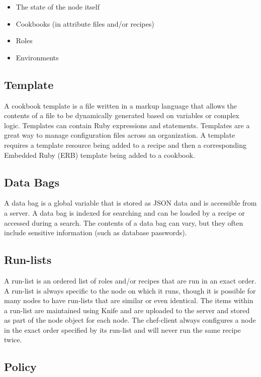 \begin{itemize}
  \item The state of the node itself
  \item Cookbooks (in attribute files and/or recipes)
  \item Roles
  \item Environments
\end{itemize}

\subsection{Template}

A cookbook template is a file written in a markup language that allows the contents of a file to be dynamically generated based on variables or complex logic. Templates can contain Ruby expressions and statements. Templates are a great way to manage configuration files across an organization. A template requires a template resource being added to a recipe and then a corresponding Embedded Ruby (ERB) template being added to a cookbook.

\subsection{Data Bags}

A data bag is a global variable that is stored as JSON data and is accessible from a server. A data bag is indexed for searching and can be loaded by a recipe or accessed during a search. The contents of a data bag can vary, but they often include sensitive information (such as database passwords).

\subsection{Run-lists}

A run-list is an ordered list of roles and/or recipes that are run in an exact order. A run-list is always specific to the node on which it runs, though it is possible for many nodes to have run-lists that are similar or even identical. The items within a run-list are maintained using Knife and are uploaded to the server and stored as part of the node object for each node. The chef-client always configures a node in the exact order specified by its run-list and will never run the same recipe twice.

\subsection{Policy}

